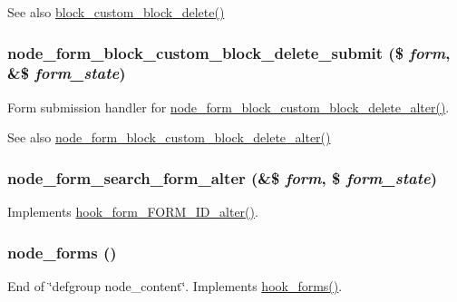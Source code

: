 \begin{DoxySeeAlso}{See also}
\hyperlink{block_8admin_8inc_a4a3fd0e8a27350b661073c26ced2912d}{block\_\-custom\_\-block\_\-delete()} 
\end{DoxySeeAlso}
\hypertarget{node_8module_a74bc394aa69fc202e9da416d717d6cd2}{
\subsubsection[{node\_\-form\_\-block\_\-custom\_\-block\_\-delete\_\-submit}]{\setlength{\rightskip}{0pt plus 5cm}node\_\-form\_\-block\_\-custom\_\-block\_\-delete\_\-submit (\$ {\em form}, \/  \&\$ {\em form\_\-state})}}
\label{node_8module_a74bc394aa69fc202e9da416d717d6cd2}
Form submission handler for \hyperlink{node_8module_adeb6930eb48582c58ccf8ae089e70cfc}{node\_\-form\_\-block\_\-custom\_\-block\_\-delete\_\-alter()}.

\begin{DoxySeeAlso}{See also}
\hyperlink{node_8module_adeb6930eb48582c58ccf8ae089e70cfc}{node\_\-form\_\-block\_\-custom\_\-block\_\-delete\_\-alter()} 
\end{DoxySeeAlso}
\hypertarget{node_8module_aafba59926e9d0a8e6f81cbb776cba7ef}{
\subsubsection[{node\_\-form\_\-search\_\-form\_\-alter}]{\setlength{\rightskip}{0pt plus 5cm}node\_\-form\_\-search\_\-form\_\-alter (\&\$ {\em form}, \/  \$ {\em form\_\-state})}}
\label{node_8module_aafba59926e9d0a8e6f81cbb776cba7ef}
Implements \hyperlink{group__hooks_ga8d4a4089551493d55911bd5c4f218264}{hook\_\-form\_\-FORM\_\-ID\_\-alter()}. \hypertarget{node_8module_aeb7774b7406a9dcba3c7f587a520df31}{
\subsubsection[{node\_\-forms}]{\setlength{\rightskip}{0pt plus 5cm}node\_\-forms ()}}
\label{node_8module_aeb7774b7406a9dcba3c7f587a520df31}
End of \char`\"{}defgroup node\_\-content\char`\"{}. Implements \hyperlink{group__hooks_gaa764fee74b85797f75c0c923cad628d5}{hook\_\-forms()}.

